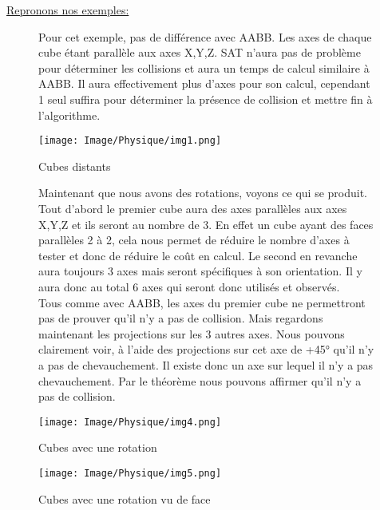 \noindent\underline{Repronons nos exemples:}
\begin{figure}[h!]
	\begin{minipage}[t!]{0.6\textwidth} 
		Pour cet exemple, pas de différence avec AABB. Les axes de chaque cube étant parallèle aux axes X,Y,Z. SAT n'aura pas de problème pour déterminer les collisions et aura un temps de calcul similaire à AABB. Il aura effectivement plus d'axes pour son calcul, cependant 1 seul suffira pour déterminer la présence de collision et mettre fin à l'algorithme.
	\end{minipage}
	\hfill 
	\begin{minipage}[t!]{0.35\textwidth}
		\centering
		\texttt{[image: Image/Physique/img1.png]}
		\caption{Cubes distants}
		\label{fig:Cubes_distant}
	\end{minipage}
\end{figure}


\begin{figure}[h!]
	\begin{minipage}[t!]{0.6\textwidth}
		Maintenant que nous avons des rotations, voyons ce qui se produit.\\
		
		\noindent Tout d'abord le premier cube aura des axes parallèles aux axes X,Y,Z et ils seront au nombre de 3. En effet un cube ayant des faces parallèles 2 à 2, cela nous permet de réduire le nombre d'axes à tester et donc de réduire le coût en calcul. Le second en revanche aura toujours 3 axes mais seront spécifiques à son orientation. Il y aura donc au total 6 axes qui seront donc utilisés et observés.\\		
		
		Tous comme avec AABB, les axes du premier cube ne permettront pas de prouver qu'il n'y a pas de collision. Mais regardons maintenant les projections sur les 3 autres axes. Nous pouvons clairement voir, à l'aide des projections sur cet axe de +45° qu'il n'y a pas de chevauchement. Il existe donc un axe sur lequel il n'y a pas chevauchement. Par le théorème nous pouvons affirmer qu'il n'y a pas de collision.
	\end{minipage}
	\hfill 
	\begin{minipage}[t!]{0.35\textwidth} 
		\texttt{[image: Image/Physique/img4.png]}
		\caption{Cubes avec une rotation}
		\label{fig:Cubes avec une rotation}
		\texttt{[image: Image/Physique/img5.png]}
		\caption{Cubes avec une rotation vu de face}
		\label{fig:Cubes avec une rotation vu de face}
	\end{minipage}
\end{figure}

